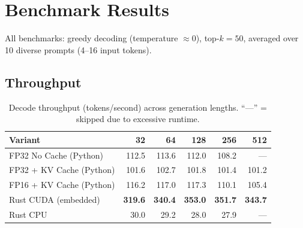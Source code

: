 \documentclass[11pt,a4paper]{article}
\begin{document}
\section{Benchmark Results}

All benchmarks: greedy decoding (temperature $\approx 0$), top-$k=50$,
averaged over 10 diverse prompts (4--16 input tokens).

\subsection{Throughput}

\begin{table}[H]
\centering
\caption{Decode throughput (tokens/second) across generation lengths.
``---'' = skipped due to excessive runtime.}
\label{tab:throughput}
\begin{tabular}{lrrrrr}
\toprule
\textbf{Variant} & \textbf{32} & \textbf{64} & \textbf{128} & \textbf{256} & \textbf{512} \\
\midrule
FP32 No Cache (Python)    & 112.5 & 113.6 & 112.0 & 108.2 & --- \\
FP32 + KV Cache (Python)  & 101.6 & 102.7 & 101.8 & 101.4 & 101.2 \\
FP16 + KV Cache (Python)  & 116.2 & 117.0 & 117.3 & 110.1 & 105.4 \\
Rust CUDA (embedded)      & \textbf{319.6} & \textbf{340.4} & \textbf{353.0} & \textbf{351.7} & \textbf{343.7} \\
Rust CPU                  & 30.0  & 29.2  & 28.0  & 27.9  & ---   \\
\bottomrule
\end{tabular}
\end{table}
\end{document}
